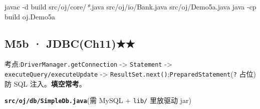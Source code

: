 \documentclass[
  11pt,
]{ctexart}
\newenvironment{Shaded}{\begin{snugshade}}{\end{snugshade}}
\newcommand{\AttributeTok}[1]{\textcolor[rgb]{0.13,0.29,0.53}{#1}}
\newcommand{\ExtensionTok}[1]{#1}
\newcommand{\NormalTok}[1]{#1}
\newcommand{\PreprocessorTok}[1]{\textcolor[rgb]{0.56,0.35,0.01}{\textit{#1}}}
\begin{document}
\begin{Shaded}
\begin{Highlighting}[]
\ExtensionTok{javac} \AttributeTok{{-}d}\NormalTok{ build src/oj/core/}\PreprocessorTok{*}\NormalTok{.java src/oj/io/Bank.java src/oj/Demo5a.java}
\ExtensionTok{java} \AttributeTok{{-}cp}\NormalTok{ build oj.Demo5a}
\end{Highlighting}
\end{Shaded}

\hypertarget{m5b-jdbcch11}{%
\subsection{M5b · JDBC(Ch11)★★}\label{m5b-jdbcch11}}

考点:\texttt{DriverManager.getConnection} -\textgreater{}
\texttt{Statement} -\textgreater{} \texttt{executeQuery/executeUpdate}
-\textgreater{}
\texttt{ResultSet.next()};\texttt{PreparedStatement}(\texttt{?} 占位)防
SQL 注入。\textbf{填空常考}。

\textbf{\texttt{src/oj/db/SimpleDb.java}}(需 MySQL + \texttt{lib/}
里放驱动 jar)
\end{document}
